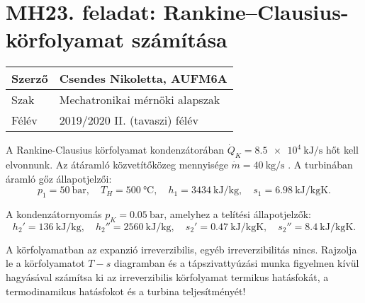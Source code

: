 \pagebreak
\section*{MH23. feladat: Rankine--Clausius-körfolyamat számítása}


\begin{tabular}{ | p{2cm} | p{14cm} | } 
	\hline
	Szerző & Csendes Nikoletta, AUFM6A \\ 
	\hline
	Szak & Mechatronikai mérnöki alapszak \\ 
	\hline
	Félév & 2019/2020 II. (tavaszi) félév \\ 
	\hline
\end{tabular}
\vspace{0.5cm}

\noindent A Rankine-Clausius körfolyamat kondenzátorában 
$\dot{Q}_{K} = \SI{8.5e4}{\kilo\joule\per\second}$ 
hőt kell elvonnunk. Az átáramló közvetítőközeg mennyisége 
$\dot{m} = \SI{40}{\kilogram\per\second}$
 . A turbinában áramló gőz állapotjelzői: \\
 
 \begin{equation*}
 	p_1 = \SI{50}{\bar}, 
 	\quad 
 	T_H = \SI{500}{\celsius}, 
 	\quad
 	h_1 = \SI{3434}{\kilo\joule\per\kilogram},
 	\quad
 	s_1 = \SI{6.98}{\kilo\joule\per\kilogram\kelvin}.
 \end{equation*}

\noindent A kondenzátornyomás ${p}_{K} = \SI{0.05}{\bar}$, amelyhez a telítési állapotjelzők:\\

\begin{equation*}
	h_2' = \SI{136}{\kilo\joule\per\kilogram}, 
	\quad 
	h_2'' = \SI{2560}{\kilo\joule\per\kilogram}, 
	\quad
	s_2' = \SI{0.47}{\kilo\joule\per\kilogram\kelvin},
	\quad
	s_2'' = \SI{8.4}{\kilo\joule\per\kilogram\kelvin}.
\end{equation*}

\noindent A körfolyamatban az expanzió irreverzibilis, egyéb irreverzibilitás nincs. Rajzolja le a körfolyamatot $T-s$ diagramban és a tápszivattyúzási munka figyelmen kívül hagyásával számítsa ki az irreverzibilis körfolyamat termikus hatásfokát, a termodinamikus hatásfokot és a turbina teljesítményét! \\


